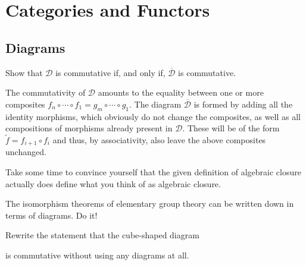\chapter{Categories and Functors}

\section{Diagrams}

\bx
Show that $\mathcal{D}$ is commutative if, and only if, $\overline{\mathcal{D}}$ is commutative.
\ex

\bs
The commutativity of $\mathcal{D}$ amounts to the equality between one or more composites $f_n\circ\cdots \circ f_1=g_m\circ \cdots\circ g_1$. The diagram $\overline{\mathcal{D}}$ is formed by adding all the identity morphisms, which obviously do not change the composites, as well as all compositions of morphisms  already present in $\mathcal{D}$. These will be of the form $\widetilde f=f_{i+1}\circ f_i$ and thus, by associativity, also leave the above composites unchanged.
\es

\bx
\ben[label=(\alph*)]
\item Take some time to convince yourself that the given definition of algebraic closure actually does define what you think of as algebraic closure.
\item The isomorphism theorems of elementary group theory can be written down in terms of diagrams. Do it!
\item Rewrite the statement that the cube-shaped diagram 
\bse
{}
\ese
is commutative without using any diagrams at all.
\een
\ex


